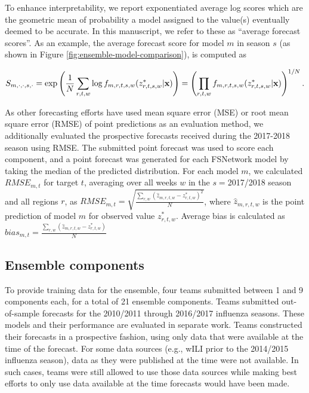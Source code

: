 \documentclass{article}\usepackage[]{graphicx}\usepackage[]{color}
\begin{document}
To enhance interpretability, we report exponentiated average log scores which are the geometric mean of probability a model assigned to the value(s) eventually deemed to be accurate. In this manuscript, we refer to these as ``average forecast scores''. As an example, the average forecast score for model $m$ in season $s$ (as shown in Figure \ref{fig:ensemble-model-comparison}), is computed as 

\begin{equation}
S_{m,\cdot,\cdot,s,\cdot} = \exp \left ( \frac{1}{N} \sum_{r,t,w} \log f_{m,r,t,s,w}(z^*_{r,t,s,w}|{\bf x}) \right ) 
  =  \left ( \prod_{r,t,w}  f_{m,r,t,s,w}(z^*_{r,t,s,w}|{\bf x}) \right ) ^{1/N}. 
\end{equation}

As other forecasting efforts have used mean square error (MSE) or root mean square error (RMSE) of point predictions as an evaluation method, we additionally evaluated the prospective forecasts received during the 2017-2018 season using RMSE. The submitted point forecast was used to score each component, and a point forecast was generated for each FSNetwork model by taking the median of the predicted distribution. For each model $m$, we calculated $RMSE_{m,t}$ for target $t$, averaging over all weeks $w$ in the $s=$2017/2018 season and all regions $r$, as $RMSE_{m,t} = \sqrt{\frac{\sum_{r,w}(\hat z_{m,r,t,w} - z^*_{r,t,w})^2}{N}}$, where $\hat z_{m,r,t,w}$ is the point prediction of model $m$ for observed value $z^*_{r,t,w}$. Average bias is calculated as $bias_{m,t} = \frac{\sum_{r,w}(\hat z_{m,r,t,w} - z^*_{r,t,w})}{N}$

\subsection*{Ensemble components}
To provide training data for the ensemble, four teams submitted between 1 and 9 components each, for a total of 21 ensemble components. Teams submitted out-of-sample forecasts for the 2010/2011 through 2016/2017 influenza seasons. These models and their performance are evaluated in separate work.\cite{reich2019collaborative} Teams constructed their forecasts in a prospective fashion, using only data that were available at the time of the forecast. For some data sources (e.g., wILI prior to the 2014/2015 influenza season), data as they were published at the time were not available. In such cases, teams were still allowed to use those data sources while making best efforts to only use data available at the time forecasts would have been made.
\end{document}
